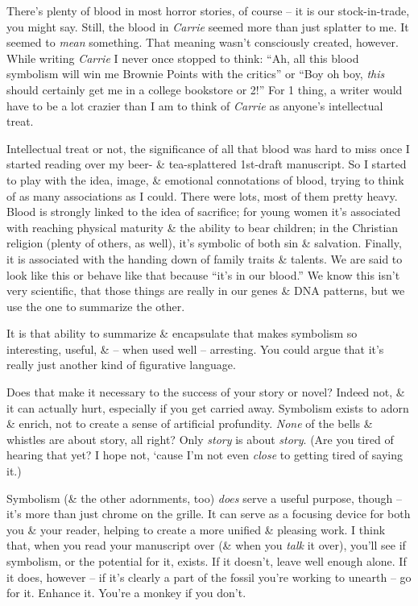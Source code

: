 \documentclass{article}
\numberwithin{equation}{section}
\begin{document}
There's plenty of blood in most horror stories, of course -- it is our stock-in-trade, you might say. Still, the blood in \textit{Carrie} seemed more than just splatter to me. It seemed to \textit{mean} something. That meaning wasn't consciously created, however. While writing \textit{Carrie} I never once stopped to think: ``Ah, all this blood symbolism will win me Brownie Points with the critics'' or ``Boy oh boy, \textit{this} should certainly get me in a college bookstore or 2!'' For 1 thing, a writer would have to be a lot crazier than I am to think of \textit{Carrie} as anyone's intellectual treat.

Intellectual treat or not, the significance of all that blood was hard to miss once I started reading over my beer- \& tea-splattered 1st-draft manuscript. So I started to play with the idea, image, \& emotional connotations of blood, trying to think of as many associations as I could. There were lots, most of them pretty heavy. Blood is strongly linked to the idea of sacrifice; for young women it's associated with reaching physical maturity \& the ability to bear children; in the Christian religion (plenty of others, as well), it's symbolic of both sin \& salvation. Finally, it is associated with the handing down of family traits \& talents. We are said to look like this or behave like that because ``it's in our blood.'' We know this isn't very scientific, that those things are really in our genes \& DNA patterns, but we use the one to summarize the other.

It is that ability to summarize \& encapsulate that makes symbolism so interesting, useful, \& -- when used well -- arresting. You could argue that it's really just another kind of figurative language.

Does that make it necessary to the success of your story or novel? Indeed not, \& it can actually hurt, especially if you get carried away. Symbolism exists to adorn \& enrich, not to create a sense of artificial profundity. \textit{None} of the bells \& whistles are about story, all right? Only \textit{story} is about \textit{story}. (Are you tired of hearing that yet? I hope not, `cause I'm not even \textit{close} to getting tired of saying it.)

Symbolism (\& the other adornments, too) \textit{does} serve a useful purpose, though -- it's more than just chrome on the grille. It can serve as a focusing device for both you \& your reader, helping to create a more unified \& pleasing work. I think that, when you read your manuscript over (\& when you \textit{talk} it over), you'll see if symbolism, or the potential for it, exists. If it doesn't, leave well enough alone. If it does, however -- if it's clearly a part of the fossil you're working to unearth -- go for it. Enhance it. You're a monkey if you don't.
\end{document}
